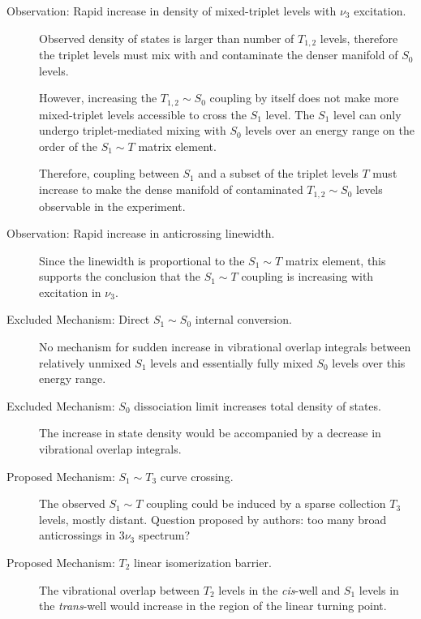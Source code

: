 \documentclass[12pt]{article}
\begin{document}
\begin{description}
\item[Observation: Rapid increase in density of mixed-triplet levels
  with $\nu_3$ excitation.]  Observed density of states is larger than
  number of $T_{1,2}$ levels, therefore the triplet levels must mix
  with and contaminate the denser manifold of $S_0$ levels.

  However, increasing the $T_{1,2} \sim S_0$ coupling by itself does
  not make more mixed-triplet levels accessible to cross the $S_1$
  level.  The $S_1$ level can only undergo triplet-mediated mixing
  with $S_0$ levels over an energy range on the order of the $S_1 \sim
  T$ matrix element.

  Therefore, coupling between $S_1$ and a subset of the triplet levels
  $T$ must increase to make the dense manifold of contaminated
  $T_{1,2} \sim S_0$ levels observable in the experiment.

\item[Observation: Rapid increase in anticrossing linewidth.]  Since
  the linewidth is proportional to the $S_1 \sim T$ matrix element,
  this supports the conclusion that the $S_1 \sim T$ coupling is
  increasing with excitation in $\nu_3$.

\item[Excluded Mechanism: Direct $S_1 \sim S_0$ internal conversion.]
  No mechanism for sudden increase in vibrational overlap integrals
  between relatively unmixed $S_1$ levels and essentially fully mixed
  $S_0$ levels over this energy range.

\item[Excluded Mechanism: $S_0$ dissociation limit increases total
  density of states.]  The increase in state density would be
  accompanied by a decrease in vibrational overlap integrals.

\item[Proposed Mechanism: $S_1 \sim T_3$ curve crossing.]  The
  observed $S_1 \sim T$ coupling could be induced by a sparse
  collection $T_3$ levels, mostly distant.  Question proposed by
  authors: too many broad anticrossings in $3\nu_3$ spectrum?

\item[Proposed Mechanism: $T_2$ linear isomerization barrier.]  The
  vibrational overlap between $T_2$ levels in the \emph{cis}-well and
  $S_1$ levels in the \emph{trans}-well would increase in the region
  of the linear turning point.
\end{description}
\end{document}
